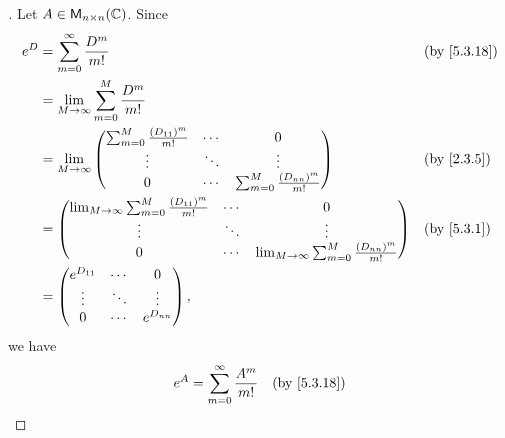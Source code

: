 \begin{proof}[]
	Let \(A \in \mathsf{M}_{{n} \times n}({\mathbb{C}})\).
	Since
	\begin{align*}
		e^D & = \sum_{m = 0}^\infty \frac{D^m}{m!}                                                                                                                     &  & \by{5.3.18} \\
		    & = \lim_{M \to \infty} \sum_{m = 0}^M \frac{D^m}{m!}                                                                                                                       \\
		    & = \lim_{M \to \infty} \begin{pmatrix}
			                            \sum_{m = 0}^M \frac{(D_{1 1})^m}{m!} & \cdots & 0                                     \\
			                            \vdots                                & \ddots & \vdots                                \\
			                            0                                     & \cdots & \sum_{m = 0}^M \frac{(D_{n n})^m}{m!}
		                            \end{pmatrix}                                         &  & \by{2.3.5}                                       \\
		    & = \begin{pmatrix}
			        \lim_{M \to \infty} \sum_{m = 0}^M \frac{(D_{1 1})^m}{m!} & \cdots & 0                                                         \\
			        \vdots                                                    & \ddots & \vdots                                                    \\
			        0                                                         & \cdots & \lim_{M \to \infty} \sum_{m = 0}^M \frac{(D_{n n})^m}{m!}
		        \end{pmatrix} &  & \by{5.3.1}                   \\
		    & = \begin{pmatrix}
			        e^{D_{1 1}} & \cdots & 0           \\
			        \vdots      & \ddots & \vdots      \\
			        0           & \cdots & e^{D_{n n}}
		        \end{pmatrix},
	\end{align*}
	we have
	\begin{align*}
		e^A & = \sum_{m = 0}^\infty \frac{A^m}{m!}                                   &  & \by{5.3.18} \\

\end{align*}
\end{proof}
